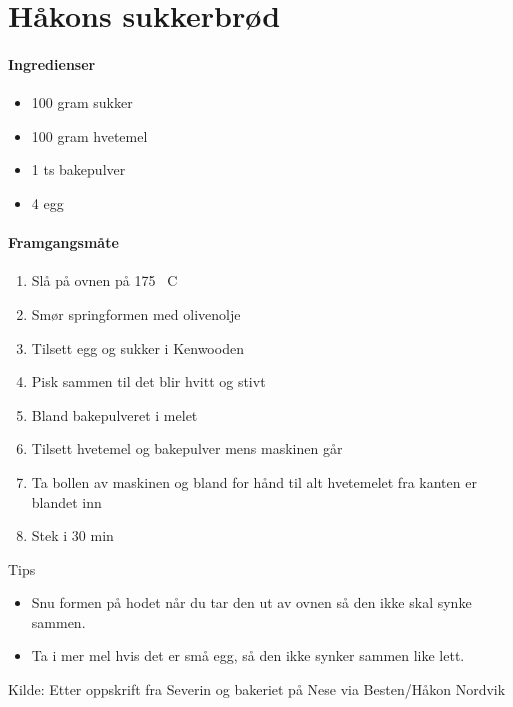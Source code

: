 \section{Håkons sukkerbrød}
\label{sukkerbrod}

\paragraph{Ingredienser}
\begin{itemize}[noitemsep]
	\item 100 gram sukker
	\item 100 gram hvetemel
	\item 1 ts bakepulver
	\item 4 egg
\end{itemize}

\paragraph{Framgangsmåte}
\begin{enumerate}[noitemsep]
	\item Slå på ovnen på 175 \degree~C
	\item Smør springformen med olivenolje
	\item Tilsett egg og sukker i Kenwooden
	\item Pisk sammen til det blir hvitt og stivt
	\item Bland bakepulveret i melet
	\item Tilsett hvetemel og bakepulver mens maskinen går
	\item Ta bollen av maskinen og bland for hånd til alt hvetemelet fra kanten er blandet inn
	\item Stek i 30 min
\end{enumerate}


Tips
\begin{itemize}[noitemsep]
	\item Snu formen på hodet når du tar den ut av ovnen så den ikke skal synke sammen.
	\item Ta i mer mel hvis det er små egg, så den ikke synker sammen like lett.\\
\end{itemize}

Kilde: Etter oppskrift fra Severin og bakeriet på Nese via Besten/Håkon Nordvik
